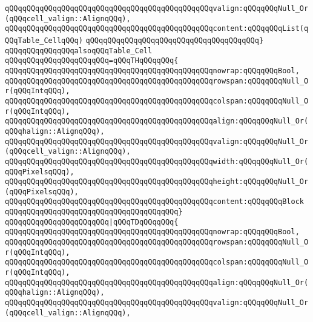 \verb|qQQqqQQqqQQqqQQqqQQqqQQqqQQqqQQqqQQqqQQqqQQqqQQqvalign:qQQqqQQqNull_Or(qQQqcell_valign::AlignqQQq),|\newline
\verb|qQQqqQQqqQQqqQQqqQQqqQQqqQQqqQQqqQQqqQQqqQQqqQQqcontent:qQQqqQQqList(qQQqTable_CellqQQq)|\newline
\verb|qQQqqQQqqQQqqQQqqQQqqQQqqQQqqQQqqQQqqQQq}|\newline
\verb|qQQqqQQqqQQqqQQqalsoqQQqTable_Cell|\newline
\verb|qQQqqQQqqQQqqQQqqQQqqQQq=qQQqTHqQQqqQQq{|\newline
\verb|qQQqqQQqqQQqqQQqqQQqqQQqqQQqqQQqqQQqqQQqqQQqqQQqnowrap:qQQqqQQqBool,|\newline
\verb|qQQqqQQqqQQqqQQqqQQqqQQqqQQqqQQqqQQqqQQqqQQqqQQqrowspan:qQQqqQQqNull_Or(qQQqIntqQQq),|\newline
\verb|qQQqqQQqqQQqqQQqqQQqqQQqqQQqqQQqqQQqqQQqqQQqqQQqcolspan:qQQqqQQqNull_Or(qQQqIntqQQq),|\newline
\verb|qQQqqQQqqQQqqQQqqQQqqQQqqQQqqQQqqQQqqQQqqQQqqQQqalign:qQQqqQQqNull_Or(qQQqhalign::AlignqQQq),|\newline
\verb|qQQqqQQqqQQqqQQqqQQqqQQqqQQqqQQqqQQqqQQqqQQqqQQqvalign:qQQqqQQqNull_Or(qQQqcell_valign::AlignqQQq),|\newline
\verb|qQQqqQQqqQQqqQQqqQQqqQQqqQQqqQQqqQQqqQQqqQQqqQQqwidth:qQQqqQQqNull_Or(qQQqPixelsqQQq),|\newline
\verb|qQQqqQQqqQQqqQQqqQQqqQQqqQQqqQQqqQQqqQQqqQQqqQQqheight:qQQqqQQqNull_Or(qQQqPixelsqQQq),|\newline
\verb|qQQqqQQqqQQqqQQqqQQqqQQqqQQqqQQqqQQqqQQqqQQqqQQqcontent:qQQqqQQqBlock|\newline
\verb|qQQqqQQqqQQqqQQqqQQqqQQqqQQqqQQqqQQqqQQq}|\newline
\verb|qQQqqQQqqQQqqQQqqQQqqQQq|\verb#|qQQqTDqQQqqQQq{#\newline
\verb|qQQqqQQqqQQqqQQqqQQqqQQqqQQqqQQqqQQqqQQqqQQqqQQqnowrap:qQQqqQQqBool,|\newline
\verb|qQQqqQQqqQQqqQQqqQQqqQQqqQQqqQQqqQQqqQQqqQQqqQQqrowspan:qQQqqQQqNull_Or(qQQqIntqQQq),|\newline
\verb|qQQqqQQqqQQqqQQqqQQqqQQqqQQqqQQqqQQqqQQqqQQqqQQqcolspan:qQQqqQQqNull_Or(qQQqIntqQQq),|\newline
\verb|qQQqqQQqqQQqqQQqqQQqqQQqqQQqqQQqqQQqqQQqqQQqqQQqalign:qQQqqQQqNull_Or(qQQqhalign::AlignqQQq),|\newline
\verb|qQQqqQQqqQQqqQQqqQQqqQQqqQQqqQQqqQQqqQQqqQQqqQQqvalign:qQQqqQQqNull_Or(qQQqcell_valign::AlignqQQq),|\newline
